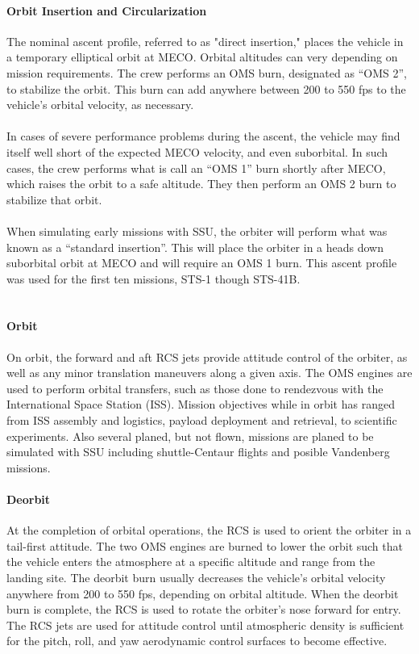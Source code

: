 \documentclass[13pt]{article}
\begin{document}
\begin{multicols}{2}
\paragraph{Orbit Insertion and Circularization}
The nominal ascent profile, referred to as "direct insertion," places the vehicle in a temporary elliptical orbit at MECO. Orbital altitudes can very depending on mission requirements. The crew performs an OMS burn, designated as ``OMS 2'', to stabilize the orbit. This burn can add anywhere between 200 to 550 fps to the vehicle's orbital velocity, as necessary.\\
\\
In cases of severe performance problems during the ascent, the vehicle may find itself well short of the expected MECO velocity, and even suborbital. In such cases, the crew performs what is call an ``OMS 1'' burn shortly after MECO, which raises the orbit to a safe altitude. They then perform an OMS 2 burn to stabilize that orbit.\\
\\
When simulating early missions with SSU, the orbiter will perform what was known as a ``standard insertion''. This will place the orbiter in a heads down suborbital orbit at MECO and will require an OMS 1 burn.  This ascent profile was used for the first ten missions, STS-1 though STS-41B.\\
\\
\paragraph{Orbit}
On orbit, the forward and aft RCS jets provide attitude control of the orbiter, as well as any minor translation maneuvers along a given axis. The OMS engines are used to perform orbital transfers, such as those done to rendezvous with the International Space Station (ISS). Mission objectives while in orbit has ranged from ISS assembly and logistics, payload deployment and retrieval, to scientific experiments.  Also several planed, but not flown, missions are planed to be simulated with SSU including shuttle-Centaur flights and posible Vandenberg missions.
\\
\paragraph{Deorbit}
At the completion of orbital operations, the RCS is used to orient the orbiter in a tail-first attitude. The two OMS engines are burned to lower the orbit such that the vehicle enters the atmosphere at a specific altitude and range from the landing site. The deorbit burn usually decreases the vehicle's orbital velocity anywhere from 200 to 550 fps, depending on orbital altitude.  When the deorbit burn is complete, the RCS is used to rotate the orbiter's nose forward for entry. The RCS jets are used for attitude control until atmospheric density is sufficient for the pitch, roll, and yaw aerodynamic control surfaces to become effective.
\\

\end{multicols}
\end{document}
